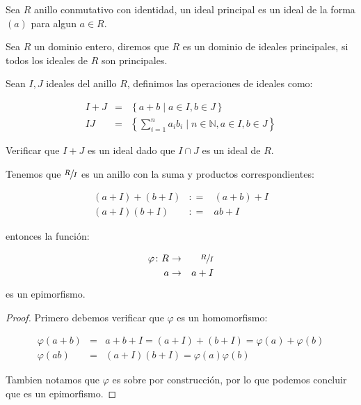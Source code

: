         \begin{definicion}
            Sea $R$ anillo conmutativo con identidad, un ideal principal es un ideal de la forma $(a)$ para algun $a \in R$.
        \end{definicion}

        \begin{definicion}
            Sea $R$ un dominio entero, diremos que $R$ es un dominio de ideales principales, si todos los ideales de $R$ son principales.
        \end{definicion}

        \begin{definicion}
            Sean $I, J$ ideales del anillo $R$, definimos las operaciones de ideales como:

            \begin{eqnarray}
                I + J & = & \left\{ a + b \mid a \in I, b \in J \right\} \\
                IJ & = & \left\{ \sum_{i=1}^n a_i b_i \mid n \in \mathbb{N}, a \in I, b \in J \right\}
            \end{eqnarray}
        \end{definicion}

        \begin{ejercicio}
            Verificar que $I + J$ es un ideal dado que $I \cap J$ es un ideal de $R$.
        \end{ejercicio}

        \begin{proposicion}
            Tenemos que $\sfrac{R}{I}$ es un anillo con la suma y productos correspondientes:

            \begin{eqnarray*}
                (a + I) + (b + I) & \colon = & (a + b) + I \\
                (a + I) (b + I) & \colon = & ab + I
            \end{eqnarray*}

            entonces la función:

            \begin{eqnarray*}
                \varphi \colon R & \to & \sfrac{R}{I} \\
                a & \to & a + I
            \end{eqnarray*}

            es un epimorfismo.
        \end{proposicion}

        \begin{proof}
            Primero debemos verificar que $\varphi$ es un homomorfismo:

            \begin{eqnarray*}
                \varphi(a + b) & = & a + b + I = (a + I) + (b + I)  = \varphi(a) + \varphi(b) \\
                \varphi(ab) & = & (a + I)(b + I) = \varphi(a) \varphi(b)
            \end{eqnarray*}

            Tambien notamos que $\varphi$ es sobre por construcción, por lo que podemos concluir que es un epimorfismo.
        \end{proof}

